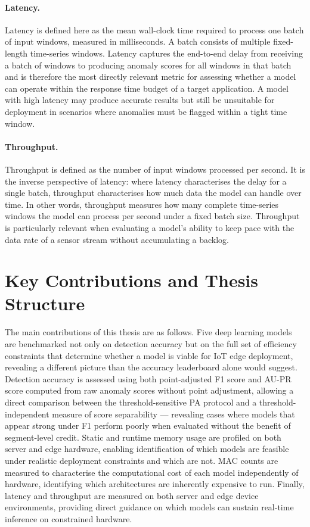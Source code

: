 \documentclass[twoside,11pt,openright]{report}
\begin{document}
\paragraph{Latency.}
Latency is defined here as the mean wall-clock time required to process one batch
of input windows, measured in milliseconds. A batch consists of multiple fixed-length time-series windows. 
Latency captures the end-to-end delay from
receiving a batch of windows to producing anomaly scores for all windows in that batch 
and is therefore the most
directly relevant metric for assessing whether a model can operate within the
response time budget of a target application. A model with high latency may
produce accurate results but still be unsuitable for deployment in scenarios where
anomalies must be flagged within a tight time window.

\paragraph{Throughput.}
Throughput is defined as the number of input windows processed per second.
It is the inverse perspective of latency: where latency characterises the delay
for a single batch, throughput characterises how much data the model can handle
over time. In other words, throughput measures how many complete time-series windows 
the model can process per second under a fixed batch size.
Throughput is particularly relevant when evaluating a model's ability
to keep pace with the data rate of a sensor stream without accumulating a
backlog. 


\section{Key Contributions and Thesis Structure}
The main contributions of this thesis are as follows. Five deep learning models are benchmarked 
not only on detection accuracy but on the full set of efficiency constraints that determine whether 
a model is viable for IoT edge deployment, revealing a different picture than the 
accuracy leaderboard alone would suggest. Detection accuracy is assessed using both point-adjusted 
F1 score and AU-PR score computed from raw anomaly scores without point adjustment, allowing a direct 
comparison between the threshold-sensitive PA protocol and a threshold-independent measure 
of score separability --- revealing cases where models that appear strong under F1 perform poorly 
when evaluated without the benefit of segment-level credit. Static and runtime memory usage are 
profiled on both server and edge hardware, enabling identification of which models are feasible 
under realistic deployment constraints and which are not. MAC counts are measured to characterise 
the computational cost of each model independently of hardware, identifying which architectures 
are inherently expensive to run. Finally, latency and throughput are measured on both server and 
edge device environments, 
providing direct guidance on which models can sustain real-time inference on constrained hardware.
\end{document}
